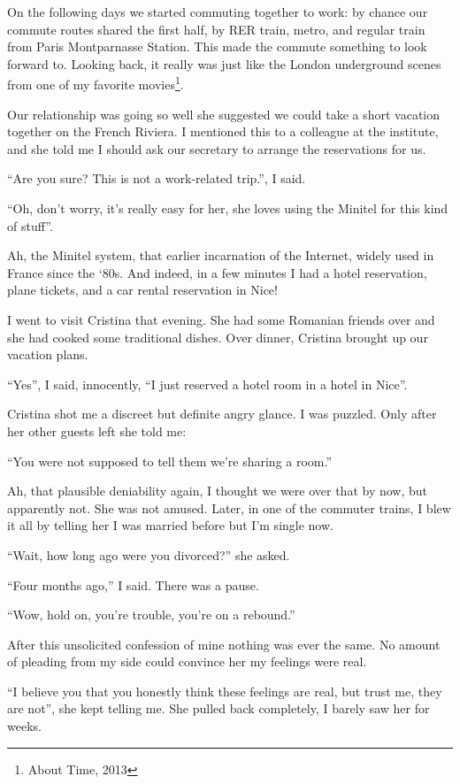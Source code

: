 \documentclass[12pt]{book}
\begin{document}
On the following days we started commuting together to work: by chance
our commute routes shared the first half, by RER train, metro, and
regular train from Paris Montparnasse Station. This made the commute
something to look forward to. Looking back, it really was just like the
London underground scenes from one of my favorite
movies\footnote{
  About Time, 2013}.

Our relationship was going so well she suggested we could take a short
vacation together on the French Riviera. I mentioned this to a colleague
at the institute, and she told me I should ask our secretary to arrange
the reservations for us.

``Are you sure? This is not a work-related trip.'', I said.

``Oh, don't worry, it's really easy for her, she loves using the Minitel
for this kind of stuff''.

Ah, the Minitel system, that earlier incarnation of the Internet, widely
used in France since the `80s. And indeed, in a few minutes I had a
hotel reservation, plane tickets, and a car rental reservation in Nice!

I went to visit Cristina that evening. She had some Romanian friends
over and she had cooked some traditional dishes. Over dinner, Cristina
brought up our vacation plans.

``Yes'', I said, innocently, ``I just reserved a hotel room in a hotel
in Nice''.

Cristina shot me a discreet but definite angry glance. I was puzzled.
Only after her other guests left she told me:

``You were not supposed to tell them we're sharing a room.''

Ah, that plausible deniability again, I thought we were over that by
now, but apparently not. She was not amused. Later, in one of the
commuter trains, I blew it all by telling her I was married before but
I'm single now.

``Wait, how long ago were you divorced?'' she asked.

``Four months ago,'' I said. There was a pause.

``Wow, hold on, you're trouble, you're on a rebound.''

After this unsolicited confession of mine nothing was ever the same. No
amount of pleading from my side could convince her my feelings were
real.

``I believe you that you honestly think these feelings are real, but
trust me, they are not'', she kept telling me. She pulled back
completely, I barely saw her for weeks.
\end{document}
